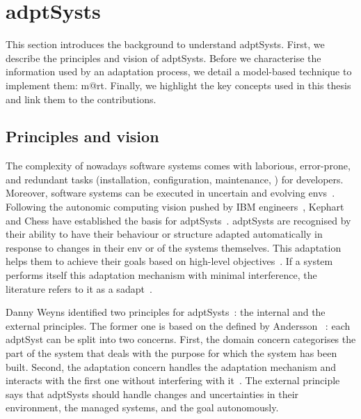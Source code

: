 \section[Adaptive systems]{\Glspl{adptSyst}}
\label{sec:back:adapt-syst}

This section introduces the background to understand \glspl{adptSyst}.
First, we describe the principles and vision of \glspl{adptSyst}.
Before we characterise the information used by an adaptation process, we detail a model-based technique to implement them: \gls{m@rt}.
Finally, we highlight the key concepts used in this thesis and link them to the contributions.

\subsection{Principles and vision}
The complexity of nowadays software systems comes with laborious, error-prone, and redundant tasks (installation, configuration, maintenance, \etc) for developers.
Moreover, software systems can be executed in uncertain and evolving \glspl{env}~\cite{DBLP:conf/dagstuhl/EsfahaniM10}.
Following the autonomic computing vision pushed by IBM engineers~\cite{computing2006architectural}, Kephart and Chess have established the basis for \glspl{adptSyst}~\cite{DBLP:journals/computer/KephartC03}.
\Glspl{adptSyst} are recognised by their ability to have their behaviour or structure adapted automatically in response to changes in their \gls{env} or of the systems themselves.
This adaptation helps them to achieve their goals based on high-level objectives~\cite{DBLP:conf/dagstuhl/ChengLGIMABBBCSDFGGGKKKLMMMPSTTWW09}.
If a system performs itself this adaptation mechanism with minimal interference, the literature refers to it as a \gls{sadapt}~\cite{DBLP:conf/dagstuhl/BrunSGGKLMPS09}.

Danny Weyns	identified two principles for \glspl{adptSyst}~\cite{DBLP:books/sp/19/Weyns19}: the internal and the external principles.
The former one is based on the  defined by Andersson \etal ~\cite{DBLP:conf/icse/AnderssonLMW09}: each \gls{adptSyst} can be split into two concerns.
First, the domain concern categorises the part of the system that deals with the purpose for which the system has been built.
Second, the adaptation concern handles the adaptation mechanism and interacts with the first one without interfering with it~\cite{DBLP:journals/tse/KramerM90}.
The external principle says that \glspl{adptSyst} should handle changes and uncertainties in their environment, the managed systems, and the goal autonomously.

